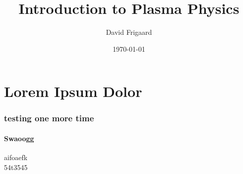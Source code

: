 \documentclass[iltitle]{../frigaardreportF}
\author{David Frigaard}
\title{Introduction to Plasma Physics}
\date{\today}
\begin{document}
\maketitle
\tableofcontents
\lipsum[1]
\part{Lorem Ipsum Dolor}
\section{testing one more time}
\lipsum[2]
\subsection{Swaoogg}
aifoaefk
 \\

54t3545
\end{document}
